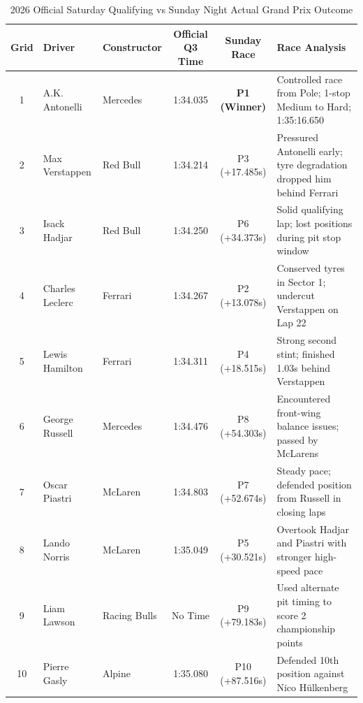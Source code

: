 \documentclass[12pt,a4paper]{report}
\begin{document}
\begin{table}[H]
\centering
\small
\begin{tabularx}{\textwidth}{c l l c c X}
\toprule
\rowcolor{gray!15}
\textbf{Grid} & \textbf{Driver} & \textbf{Constructor} & \textbf{Official Q3 Time} & \textbf{Sunday Race} & \textbf{Race Analysis} \\
\midrule
1 & A.K. Antonelli & Mercedes & 1:34.035 & \textbf{P1 (Winner)} & Controlled race from Pole; 1-stop Medium to Hard; 1:35:16.650 \\
2 & Max Verstappen & Red Bull & 1:34.214 & P3 (+17.485s) & Pressured Antonelli early; tyre degradation dropped him behind Ferrari \\
3 & Isack Hadjar & Red Bull & 1:34.250 & P6 (+34.373s) & Solid qualifying lap; lost positions during pit stop window \\
4 & Charles Leclerc & Ferrari & 1:34.267 & P2 (+13.078s) & Conserved tyres in Sector 1; undercut Verstappen on Lap 22 \\
5 & Lewis Hamilton & Ferrari & 1:34.311 & P4 (+18.515s) & Strong second stint; finished 1.03s behind Verstappen \\
6 & George Russell & Mercedes & 1:34.476 & P8 (+54.303s) & Encountered front-wing balance issues; passed by McLarens \\
7 & Oscar Piastri & McLaren & 1:34.803 & P7 (+52.674s) & Steady pace; defended position from Russell in closing laps \\
8 & Lando Norris & McLaren & 1:35.049 & P5 (+30.521s) & Overtook Hadjar and Piastri with stronger high-speed pace \\
9 & Liam Lawson & Racing Bulls & No Time & P9 (+79.183s) & Used alternate pit timing to score 2 championship points \\
10 & Pierre Gasly & Alpine & 1:35.080 & P10 (+87.516s) & Defended 10th position against Nico Hülkenberg \\
\bottomrule
\end{tabularx}
\caption{2026 Official Saturday Qualifying vs Sunday Night Actual Grand Prix Outcome}
\label{tab:cota_actual_vs_quali}
\end{table}
\end{document}
